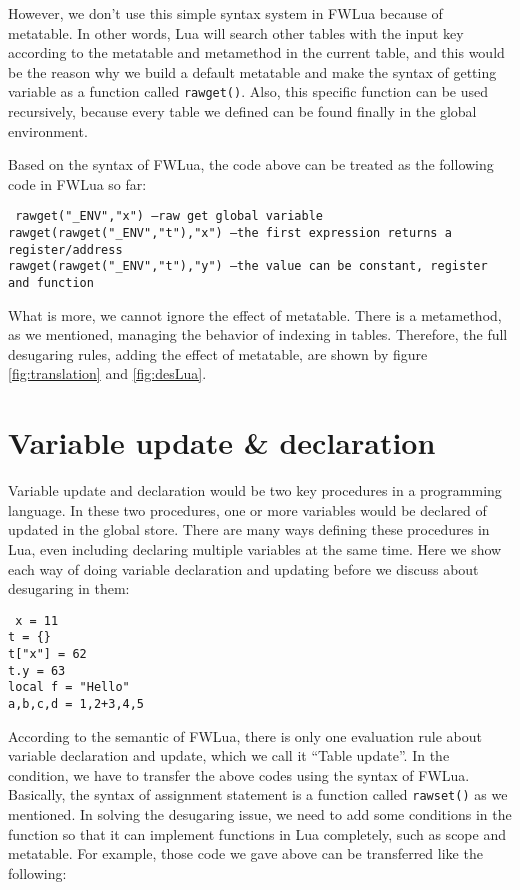 However, we don't use this simple syntax system in FWLua because of metatable. In other words, Lua will search other tables with the input key according to the metatable and metamethod in the current table, and this would be the reason why we build a default metatable and make the syntax of getting variable as a function called {\tt rawget()}. Also, this specific function can be used recursively, because every table we defined can be found finally in the global environment.

Based on the syntax of FWLua, the code above can be treated as the following code in FWLua so far:
\begin{flushleft}
{\tt
rawget("\_ENV","x") --raw get global variable\\
rawget(rawget("\_ENV","t"),"x") --the first expression returns a register/address\\
rawget(rawget("\_ENV","t"),"y") --the value can be constant, register and function\\
}
\end{flushleft}

What is more, we cannot ignore the effect of metatable. There is a metamethod, as we mentioned, managing the behavior of indexing in tables. Therefore, the full desugaring rules, adding the effect of metatable, are shown by figure \ref{fig:translation} and \ref{fig:desLua}.


\section{Variable update \& declaration}
Variable update and declaration would be two key procedures in a programming language. In these two procedures, one or more variables would be declared of updated in the global store. There are many ways defining these procedures in Lua, even including declaring multiple variables at the same time. Here we show each way of doing variable declaration and updating before we discuss about desugaring in them:

\begin{flushleft}
{\tt
x = 11\\
t = \{\}\\
t["x"] = 62\\
t.y = 63\\
local f = "Hello"\\
a,b,c,d = 1,2+3,4,5\\ 
}
\end{flushleft}
According to the semantic of FWLua, there is only one evaluation rule about variable declaration and update, which we call it ``Table update''. In the condition, we have to transfer the above codes using the syntax of FWLua. Basically, the syntax of assignment statement is a function called {\tt rawset()} as we mentioned. In solving the desugaring issue, we need to add some conditions in the function so that it can implement functions in Lua completely, such as scope and metatable. For example, those code we gave above can be transferred like the following:

